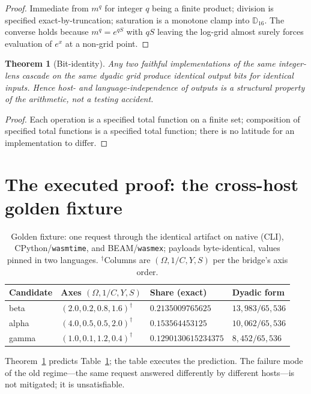 \documentclass[12pt,oneside]{report}
\theoremstyle{plain}
\newtheorem{theorem}{Theorem}[chapter]
\theoremstyle{definition}
\theoremstyle{remark}
\newcommand{\code}[1]{\texttt{#1}}
\newcommand{\dyad}{\mathbb{D}}
\begin{document}
\begin{proof}
Immediate from $m^q$ for integer $q$ being a finite product; division
is specified exact-by-truncation; saturation is a monotone clamp into
$\dyad_{16}$. The converse holds because $m^q=e^{qS}$ with $qS$
leaving the log-grid almost surely forces evaluation of $e^x$ at a
non-grid point.
\end{proof}

\begin{theorem}[Bit-identity]
\label{thm:bit-identity}
Any two faithful implementations of the same integer-lens cascade on
the same dyadic grid produce identical output bits for identical
inputs. Hence host- and language-independence of outputs is a
structural property of the arithmetic, not a testing accident.
\end{theorem}

\begin{proof}
Each operation is a specified total function on a finite set;
composition of specified total functions is a specified total
function; there is no latitude for an implementation to differ.
\end{proof}

\section{The executed proof: the cross-host golden fixture}
\label{sec:golden}

\begin{table}[h]
\centering
\begin{tabular}{llll}
\toprule
Candidate & Axes $(\Omega,1/C,Y,S)$ & Share (exact) & Dyadic form \\
\midrule
beta  & $(2.0,0.2,0.8,1.6)^{\dagger}$ & $0.2135009765625$ &
$13{,}983/65{,}536$\\
alpha & $(4.0,0.5,0.5,2.0)^{\dagger}$ & $0.153564453125$ &
$10{,}062/65{,}536$\\
gamma & $(1.0,0.1,1.2,0.4)^{\dagger}$ & $0.1290130615234375$ &
$8{,}452/65{,}536$\\
\bottomrule
\end{tabular}
\caption{Golden fixture: one request through the identical artifact on
native (CLI), CPython/\code{wasmtime}, and BEAM/\code{wasmex}; payloads
byte-identical, values pinned in two languages. $^{\dagger}$Columns are
$(\Omega, 1/C, Y, S)$ per the bridge's axis order.}
\label{tab:golden}
\end{table}

Theorem~\ref{thm:bit-identity} predicts
Table~\ref{tab:golden}; the table executes the prediction. The failure
mode of the old regime---the same request answered differently by
different hosts---is not mitigated; it is unsatisfiable.
\end{document}
